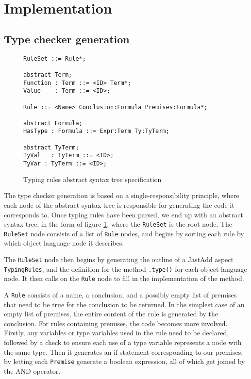 \documentclass[nofilelist]{cslthse-msc}
\begin{document}
\cite{Hedin2011}
\section{Implementation} %
\subsection{Type checker generation}
\begin{figure}[h]
\begin{lstlisting}[]
RuleSet ::= Rule*;

abstract Term;
Function : Term ::= <ID> Term*;
Value    : Term ::= <ID>;

Rule ::= <Name> Conclusion:Formula Premises:Formula*;

abstract Formula;
HasType : Formula ::= Expr:Term Ty:TyTerm;

abstract TyTerm;
TyVal   : TyTerm ::= <ID>;
TyVar : TyTerm ::= <ID>;
\end{lstlisting}
  \caption{Typing rules abstract syntax tree specification}
  \label{trastspec}
\end{figure}

The type checker generation is based on a single-responsibility principle, where each node of the abstract syntax tree is responsible for generating the code it corresponds to.
Once typing rules have been parsed, we end up with an abstract syntax tree, in the form of figure \ref{trastspec}, where the \verb|RuleSet| is the root node.
The \verb|RuleSet| node consists of a list of \verb|Rule| nodes, and begins by sorting each rule by which object language node it describes.

The \verb|RuleSet| node then begins by generating the outline of a JastAdd aspect \verb|TypingRules|, and the definition for the method \verb|.type()| for each object language node.
It then calls on the \verb|Rule| node to fill in the implementation of the method.

A \verb|Rule| consists of a name, a conclusion, and a possibly empty list of premises that need to be true for the conclusion to be returned.
In the simplest case of an empty list of premises, the entire content of the rule is generated by the conclusion.
For rules containing premises, the code becomes more involved.
Firstly, any variables or type variables used in the rule need to be declared, followed by a check to ensure each use of a type variable represents a node with the same type.
Then it generates an if-statement corresponding to our premises, by letting each \verb|Premise| generate a boolean expression, all of which get joined by the AND operator.
\end{document}
